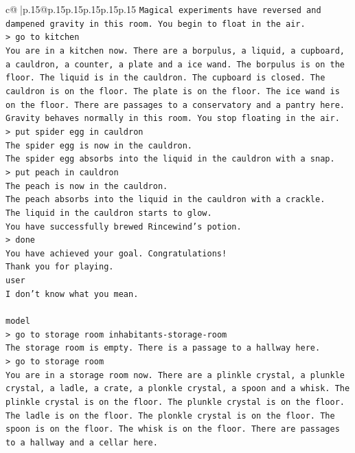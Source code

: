 \documentclass{article}
\begin{document}
{\begin{supertabular}{c@{$\;$}|p{.15\linewidth}@{}p{.15\linewidth}p{.15\linewidth}p{.15\linewidth}p{.15\linewidth}p{.15\linewidth}}
{{{\texttt{Magical experiments have reversed and dampened gravity in this room. You begin to float in the air.} \\
\texttt{> go to kitchen} \\
\texttt{You are in a kitchen now. There are a borpulus, a liquid, a cupboard, a cauldron, a counter, a plate and a ice wand. The borpulus is on the floor. The liquid is in the cauldron. The cupboard is closed. The cauldron is on the floor. The plate is on the floor. The ice wand is on the floor. There are passages to a conservatory and a pantry here.} \\
\texttt{Gravity behaves normally in this room. You stop floating in the air.} \\
\texttt{> put spider egg in cauldron} \\
\texttt{The spider egg is now in the cauldron.} \\
\texttt{The spider egg absorbs into the liquid in the cauldron with a snap.} \\
\texttt{> put peach in cauldron} \\
\texttt{The peach is now in the cauldron.} \\
\texttt{The peach absorbs into the liquid in the cauldron with a crackle.} \\
\texttt{The liquid in the cauldron starts to glow.} \\
\texttt{You have successfully brewed Rincewind's potion.} \\
\texttt{> done} \\
\texttt{You have achieved your goal. Congratulations!} \\
\texttt{Thank you for playing.} \\
\texttt{user} \\
\texttt{I don't know what you mean.} \\
\\ 
\texttt{model} \\
\texttt{> go to storage room inhabitants{-}storage{-}room} \\
\texttt{The storage room is empty. There is a passage to a hallway here.} \\
\texttt{> go to storage room} \\
\texttt{You are in a storage room now. There are a plinkle crystal, a plunkle crystal, a ladle, a crate, a plonkle crystal, a spoon and a whisk. The plinkle crystal is on the floor. The plunkle crystal is on the floor. The ladle is on the floor. The plonkle crystal is on the floor. The spoon is on the floor. The whisk is on the floor. There are passages to a hallway and a cellar here.} \\
}}}
\end{supertabular}}
\end{document}
